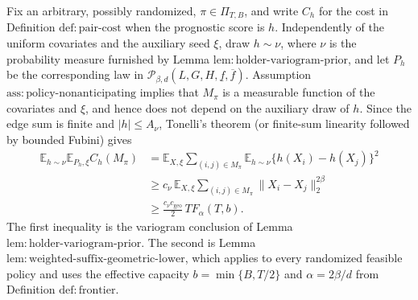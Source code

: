 Fix an arbitrary, possibly randomized, \(\pi\in\Pi_{T,B}\), and write \(C_h\) for the cost in Definition \(\mathrm{def:pair\text{-}cost}\) when the prognostic score is \(h\).  Independently of the uniform covariates and the auxiliary seed \(\xi\), draw \(h\sim\nu\), where \(\nu\) is the probability measure furnished by Lemma \(\mathrm{lem:holder\text{-}variogram\text{-}prior}\), and let \(P_h\) be the corresponding law in \(\mathcal P_{\beta,d}(L,G,H,\underline f,\overline f)\).  Assumption \(\mathrm{ass:policy\text{-}nonanticipating}\) implies that \(M_\pi\) is a measurable function of the covariates and \(\xi\), and hence does not depend on the auxiliary draw of \(h\).  Since the edge sum is finite and \(|h|\le A_\nu\), Tonelli's theorem (or finite-sum linearity followed by bounded Fubini) gives
\[
\begin{aligned}
\mathbb E_{h\sim\nu}\mathbb E_{P_h,\xi} C_h(M_\pi)
&=\mathbb E_{X,\xi}\sum_{(i,j)\in M_\pi}
  \mathbb E_{h\sim\nu}\{h(X_i)-h(X_j)\}^2 \\
&\ge c_\nu\,\mathbb E_{X,\xi}\sum_{(i,j)\in M_\pi}
  \|X_i-X_j\|_2^{2\beta} \\
&\ge \frac{c_\nu c_{\mathrm{geo}}}{2}\,T F_\alpha(T,b).
\end{aligned}
\tag{4}
\]
The first inequality is the variogram conclusion of Lemma \(\mathrm{lem:holder\text{-}variogram\text{-}prior}\).  The second is Lemma \(\mathrm{lem:weighted\text{-}suffix\text{-}geometric\text{-}lower}\), which applies to every randomized feasible policy and uses the effective capacity \(b=\min\{B,T/2\}\) and \(\alpha=2\beta/d\) from Definition \(\mathrm{def:frontier}\).

